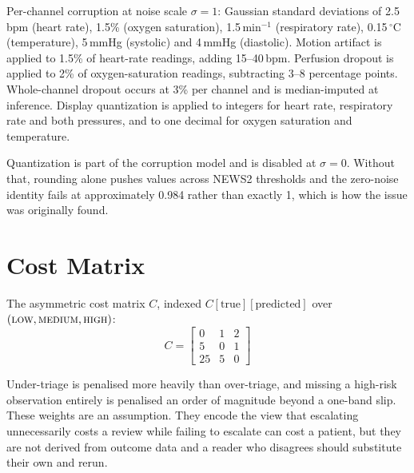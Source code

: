 \documentclass[lettersize,journal]{IEEEtran}
\begin{document}
Per-channel corruption at noise scale $\sigma = 1$: Gaussian standard deviations
of 2.5\,bpm (heart rate), 1.5\% (oxygen saturation), 1.5\,min$^{-1}$
(respiratory rate), 0.15\,$^{\circ}$C (temperature), 5\,mmHg (systolic) and
4\,mmHg (diastolic). Motion artifact is applied to 1.5\% of heart-rate readings,
adding 15--40\,bpm. Perfusion dropout is applied to 2\% of oxygen-saturation
readings, subtracting 3--8 percentage points. Whole-channel dropout occurs at
3\% per channel and is median-imputed at inference. Display quantization is
applied to integers for heart rate, respiratory rate and both pressures, and to
one decimal for oxygen saturation and temperature.

Quantization is part of the corruption model and is disabled at $\sigma = 0$.
Without that, rounding alone pushes values across NEWS2 thresholds and the
zero-noise identity fails at approximately 0.984 rather than exactly 1, which is
how the issue was originally found.

\section{Cost Matrix}
\label{app:cost}

The asymmetric cost matrix $C$, indexed $C[\text{true}][\text{predicted}]$ over
$(\textsc{low}, \textsc{medium}, \textsc{high})$:
\begin{equation}
C =
\begin{bmatrix}
0 & 1 & 2 \\
5 & 0 & 1 \\
25 & 5 & 0
\end{bmatrix}
\end{equation}

Under-triage is penalised more heavily than over-triage, and missing a
high-risk observation entirely is penalised an order of magnitude beyond a
one-band slip. These weights are an assumption. They encode the view that
escalating unnecessarily costs a review while failing to escalate can cost a
patient, but they are not derived from outcome data and a reader who disagrees
should substitute their own and rerun.
\end{document}

